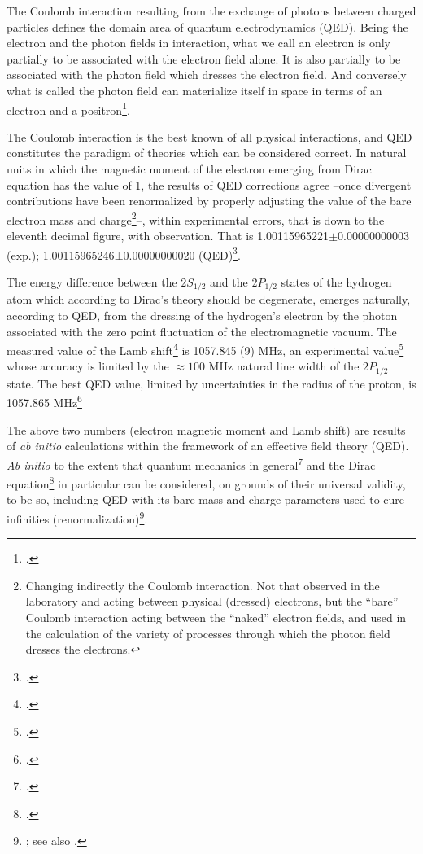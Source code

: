 The Coulomb interaction resulting from the exchange of photons between charged particles defines the domain area of quantum electrodynamics (QED). Being the electron and the photon fields in interaction, what we call an electron is only partially to be associated with the electron field alone. It is also partially to be associated with the photon field which dresses the electron field. And conversely what is called the photon field can materialize itself in space in terms of an electron and a positron\footnote{\cite{Schwinger:01}.}.

The Coulomb interaction is the best known of all physical interactions, and QED constitutes the paradigm of theories which can be considered correct. In natural units in which the magnetic moment of the electron emerging from Dirac equation has the value of 1, the results of QED corrections agree --once divergent contributions have been renormalized by properly adjusting the value of the bare electron mass and charge\footnote{Changing indirectly the Coulomb interaction. Not that observed in the laboratory and acting between physical (dressed) electrons, but the ``bare'' Coulomb interaction acting between the ``naked'' electron fields, and used in the calculation of the variety of processes through which the photon field dresses the electrons.}--, within experimental errors, that is down to the eleventh decimal figure, with observation. That is 1.00115965221$\pm$0.00000000003 (exp.); 1.00115965246$\pm$0.00000000020 (QED)\footnote{\cite{Kinoshita:90}.}.


 The energy difference between the $2S_{1/2}$ and the $2P_{1/2}$ states of the hydrogen atom which according to Dirac's theory should be degenerate, emerges naturally, according to QED, from the dressing of the hydrogen's electron by the photon associated with the zero point fluctuation of the electromagnetic vacuum. The measured value of the Lamb shift\footnote{\cite{Lamb:51b}.}  is 1057.845 (9) MHz, an experimental value\footnote{\cite{Lundeen:81,Lundeen:86,Pipkin:90}.} whose accuracy is limited by the $\approx 100$ MHz natural line width of the $2P_{1/2}$ state. The best QED value, limited by uncertainties in the radius of the proton, is 1057.865 MHz\footnote{\cite{Sapirstein:90,Grotch:94}.}

The above two numbers (electron magnetic moment and Lamb shift) are results of \textit{ab initio} calculations within the framework of an effective field theory (QED). \textit{Ab initio} to the extent that quantum mechanics in general\footnote{\cite{Heisenberg:25,Born:25a,Born:25b,Dirac:25,Schrodinger:26,Born:26,Heisenberg:27,Pauli:25}.} and the Dirac equation\footnote{\cite{Dirac:28a,Dirac:28b}.} in particular can be considered, on grounds of their universal validity, to be so, including QED with its bare mass and charge parameters used to cure infinities (renormalization)\footnote{\cite{Feynman:49,Schwinger:48,Tomonaga:46}; see also \cite{Dyson:49,Schwinger:58,Schweber:94}.}.

